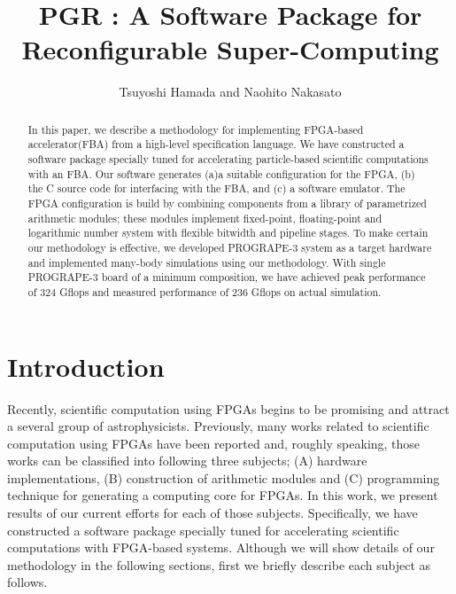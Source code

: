 \documentclass{llncs}
\begin{document}
\def\addtocontents#1#2{}%
\def\addcontentsline#1#2#3{}%
\def\markboth#1#2{}%
%
\title {PGR : A Software Package for Reconfigurable Super-Computing}

\author{Tsuyoshi Hamada and Naohito Nakasato}


\maketitle
%
\begin{abstract}
In this paper, we describe a methodology for implementing FPGA-based
accelerator(FBA) from a high-level specification language.  We have
constructed a software package specially tuned for accelerating
particle-based scientific computations with an FBA.  Our software
generates (a)a suitable configuration for the FPGA, (b) the C source
code for interfacing with the FBA, and (c) a software emulator. The
FPGA configuration is build by combining components from a library of
parametrized arithmetic modules; these modules implement fixed-point,
floating-point and logarithmic number system with flexible bitwidth
and pipeline stages.  To make certain our methodology is effective, we
developed PROGRAPE-3 system as a target hardware and implemented
many-body simulations using our methodology.  With single PROGRAPE-3
board of a minimum composition, we have achieved peak performance of
324 Gflops and measured performance of 236 Gflops on actual
simulation.
\end{abstract}
%
\section{Introduction}
%

Recently, scientific computation using FPGAs begins to be promising
and attract a several group of astrophysicists.
Previously, many works related to scientific computation using FPGAs
have been reported and, roughly speaking, 
those works can be classified into following three subjects;
(A) hardware implementations, (B) construction of arithmetic modules
and (C) programming technique for generating a
computing core for FPGAs. 
In this work, we present results of our current efforts for each of those subjects. 
Specifically, we have constructed a software package specially 
tuned for accelerating scientific computations with FPGA-based systems.
Although we will show details of our methodology in the following sections, 
first we briefly describe each subject as follows.
\end{document}
